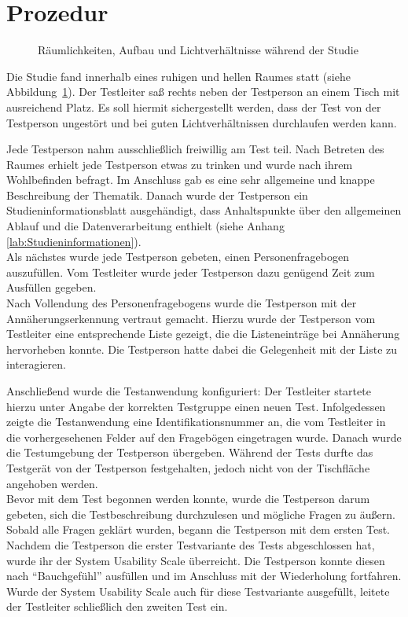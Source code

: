 \documentclass[12pt,numbers=noenddot,parskip,bibliography=totocnumbered,listof=totocnumbered]{scrreprt}
\begin{document}
\section{Prozedur}
\begin{figure}
\centering
{}%
\vfill
{}%
\vfill
{}%
\caption{Räumlichkeiten, Aufbau und Lichtverhältnisse während der Studie}
\label{prozedurumgebung}
\end{figure}
Die Studie fand innerhalb eines ruhigen und hellen Raumes statt (siehe Abbildung~\ref{prozedurumgebung}). Der Testleiter saß rechts neben der Testperson an einem Tisch mit ausreichend Platz. Es soll hiermit sichergestellt werden, dass der Test von der Testperson ungestört und bei guten Lichtverhältnissen durchlaufen werden kann.

Jede Testperson nahm ausschließlich freiwillig am Test teil. Nach Betreten des Raumes erhielt jede Testperson etwas zu trinken und wurde nach ihrem Wohlbefinden befragt. Im Anschluss gab es eine sehr allgemeine und knappe Beschreibung der Thematik. Danach wurde der Testperson ein Studieninformationsblatt ausgehändigt, dass Anhaltspunkte über den allgemeinen Ablauf und die Datenverarbeitung enthielt (siehe Anhang \ref{lab:Studieninformationen}).\\
Als nächstes wurde jede Testperson gebeten, einen Personenfragebogen auszufüllen. Vom Testleiter wurde jeder Testperson dazu genügend Zeit zum Ausfüllen gegeben.\\
Nach Vollendung des Personenfragebogens wurde die Testperson mit der Annäherungserkennung vertraut gemacht. Hierzu wurde der Testperson vom Testleiter eine entsprechende Liste gezeigt, die die Listeneinträge bei Annäherung hervorheben konnte. Die Testperson hatte dabei die Gelegenheit mit der Liste zu interagieren.

Anschließend wurde die Testanwendung konfiguriert: Der Testleiter startete hierzu unter Angabe der korrekten Testgruppe einen neuen Test. Infolgedessen zeigte die Testanwendung eine Identifikationsnummer an, die vom Testleiter in die vorhergesehenen Felder auf den Fragebögen eingetragen wurde. Danach wurde die Testumgebung der Testperson übergeben. Während der Tests durfte das Testgerät von der Testperson festgehalten, jedoch nicht von der Tischfläche angehoben werden.\\
Bevor mit dem Test begonnen werden konnte, wurde die Testperson darum gebeten, sich die Testbeschreibung durchzulesen und mögliche Fragen zu äußern. Sobald alle Fragen geklärt wurden, begann die Testperson mit dem ersten Test.\\
Nachdem die Testperson die erster Testvariante des Tests abgeschlossen hat, wurde ihr der System Usability Scale überreicht. Die Testperson konnte diesen nach "`Bauchgefühl"' ausfüllen und im Anschluss mit der Wiederholung fortfahren. Wurde der System Usability Scale auch für diese Testvariante ausgefüllt, leitete der Testleiter schließlich den zweiten Test ein.
\end{document}
